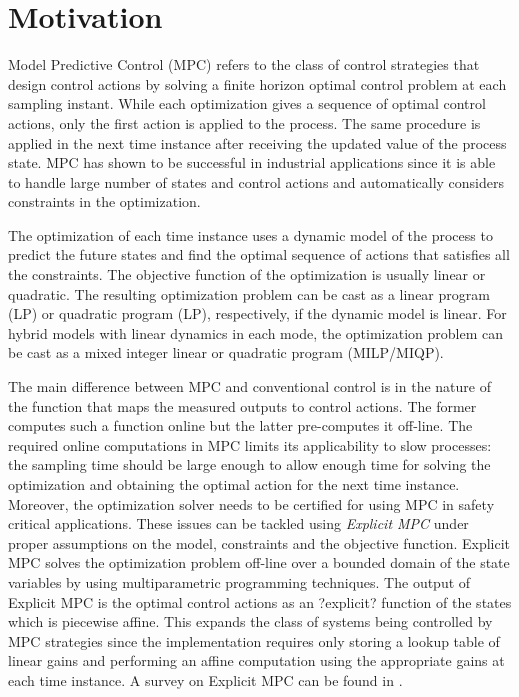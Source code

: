 \section{Motivation}

Model Predictive Control (MPC) refers to the class of control strategies that design control actions by solving a finite horizon optimal control problem at each sampling instant. While each optimization gives a sequence of optimal control actions, only the first action is applied to the process. The same procedure is applied in the next time instance after receiving the updated value of the process state. MPC has shown to be successful in industrial applications since it is able to handle large number of states and control actions and automatically considers constraints in the optimization.

The optimization of each time instance uses a dynamic model of the process to predict the future states and find the optimal sequence of actions that satisfies all the constraints. The objective function of the optimization is usually linear or quadratic. The resulting optimization problem can be cast as a linear program (LP) or quadratic program (LP), respectively, if the dynamic model is linear. For hybrid models with linear dynamics in each mode, the optimization problem can be cast as a mixed integer linear or quadratic program (MILP/MIQP). 

 The main difference between MPC and conventional control is in the nature of the function that maps the measured outputs to control actions. The former computes such a function online but the latter pre-computes it off-line. The required online computations in MPC limits its applicability to slow processes: the sampling time should be large enough to allow enough time for solving the optimization and obtaining the optimal action for the next time instance. Moreover, the optimization solver needs to be certified for using MPC in safety critical applications.
These issues can be tackled using \emph{Explicit MPC} under proper assumptions on the model, constraints and the objective function. Explicit MPC solves the optimization problem off-line over a bounded domain of the state variables by using multiparametric programming techniques. The output of Explicit MPC is the optimal control actions as an ?explicit? function of the states which is piecewise affine. This expands the class of systems being controlled by MPC strategies since the implementation requires only storing a lookup table of linear gains and performing an affine computation using the appropriate gains at each time instance. A survey on Explicit MPC can be found in \cite{Alessio2009}. 

